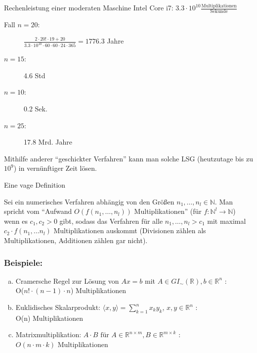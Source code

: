 Rechenleistung einer moderaten Maschine Intel Core i7: $3.3 \cdot 10^{10} 
\frac{\text{Multiplikationen}}{\text{Sekunde}}$ 

\begin{description}
\item[\rm Fall $n = 20$:] $\frac{2 \cdot 20! \cdot 19 + 20}{3.3 \cdot 10^{10} 
\cdot 60 \cdot 60 \cdot 24 \cdot 365} = 1776.3$ Jahre
\item[$n = 15$:] 4.6 Std
\item[$n = 10$:] 0.2 Sek.
\item[$n = 25$:] 17.8 Mrd. Jahre
\end{description}

Mithilfe anderer "`geschickter Verfahren"' kann man solche LSG 
(heutzutage bis zu $10^9$) in vernünftiger Zeit lösen.

Eine vage Definition

\begin{Definition}
Sei ein numerisches Verfahren abhängig von den 
Größen $n_1, \dots, n_l \in \mathbb{N}$. Man spricht vom 
"`Aufwand $O(f(n_1, \dots, n_l))$ Multiplikationen"'
(für $f: \mathbb{N}^l \rightarrow \mathbb{N}$) wenn es 
$c_1, c_2 > 0$ gibt, sodass das Verfahren für alle 
$n_1, \dots, n_l > c_1$ mit maximal $c_2 \cdot f(n_1, \dots n_l)$
Multiplikationen auskommt (Divisionen zählen als Multiplikationen, 
Additionen zählen gar nicht).
\end{Definition}

\subsubsection*{Beispiele:}

\begin{enumerate}[(a)]
\item Cramersche Regel zur Lösung von
      $Ax = b$ mit $A \in GI_{\sim}(\mathbb{R}), 
      b \in \mathbb{R}^n$ : \\
      O($n! \cdot (n-1)\cdot n$) Multiplikationen
\item Euklidisches Skalarprodukt:
      $\langle x,y\rangle = \sum_{k=1}^n x_k y_k$, $x,y \in \mathbb{R}^n$ :\\
      O(n) Multiplikationen
\item Matrixmultiplikation: $A \cdot B \text{ für } A\in 
      \mathbb{R}^{n \times m}, B \in \mathbb{R}^{m \times k}$ : \\
      $O(n \cdot m \cdot k ) $ Multiplikationen
\end{enumerate}  

